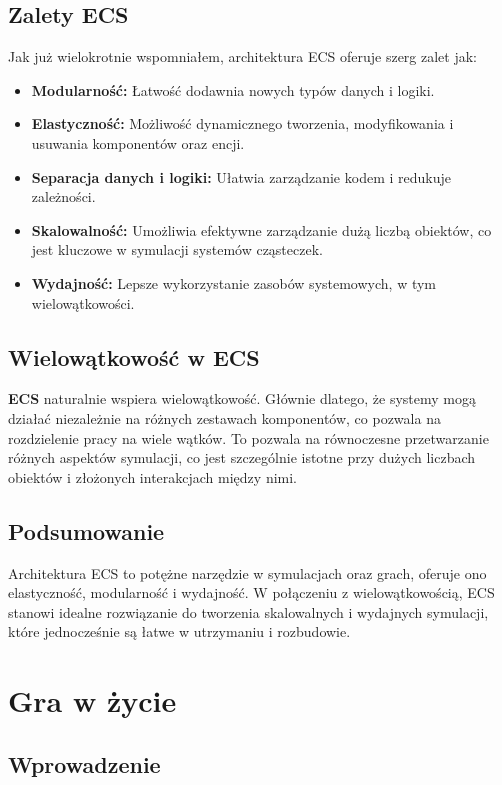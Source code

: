 \documentclass[11pt]{article}
\begin{document}
\subsection{Zalety ECS}
Jak już wielokrotnie wspomniałem, architektura ECS oferuje szerg zalet jak:
\begin{itemize}
    \item \textbf{Modularność:} Łatwość dodawnia nowych typów danych i logiki.
    \item \textbf{Elastyczność:} Możliwość dynamicznego tworzenia, modyfikowania i usuwania komponentów oraz encji.
    \item \textbf{Separacja danych i logiki:} Ułatwia zarządzanie kodem i redukuje zależności.
    \item \textbf{Skalowalność:} Umożliwia efektywne zarządzanie dużą liczbą obiektów, co jest kluczowe 
    w symulacji systemów cząsteczek.
    \item \textbf{Wydajność:} Lepsze wykorzystanie zasobów systemowych, w tym wielowątkowości.
\end{itemize}

\subsection{Wielowątkowość w ECS}
\textbf{ECS} naturalnie wspiera wielowątkowość. Głównie dlatego, że systemy mogą działać niezależnie na różnych zestawach
komponentów, co pozwala na rozdzielenie pracy na wiele wątków. To pozwala na równoczesne przetwarzanie różnych aspektów
symulacji, co jest szczególnie istotne przy dużych liczbach obiektów i złożonych interakcjach między nimi.

\subsection{Podsumowanie}
Architektura ECS to potężne narzędzie w symulacjach oraz grach, oferuje ono elastyczność, modularność i 
wydajność. W połączeniu z wielowątkowością, ECS stanowi idealne rozwiązanie do tworzenia
skalowalnych i wydajnych symulacji, które jednocześnie są łatwe w utrzymaniu i rozbudowie.

\section{Gra w życie}
\subsection{Wprowadzenie}
\end{document}
